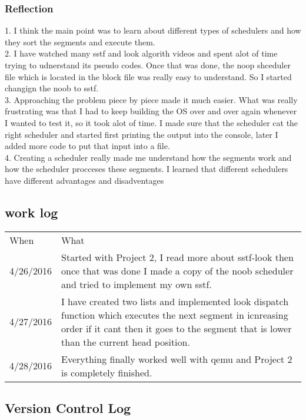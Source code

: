 \documentclass[letterpaper,10pt,draftclsnofoot,onecolumn]{IEEEtran}
\begin{document}
\subsubsection*{Reflection}
	1. I think the main point was to learn about different types of schedulers and how they sort the segments and execute them.\\
	2. I have watched many sstf and look algorith videos and spent alot of time trying to udnerstand its pseudo codes. Once that was done, the noop shceduler file which is located in the block file was really easy to understand. So I started changign the noob to sstf.\\
	3. Approaching the problem piece by piece made it much easier. What was really frustrating was that I had to keep building the OS over and over again whenever I wanted to test it, so it took alot of time. I made sure that the scheduler cat the right scheduler and started first printing the output into the console, later I added more code to put that input into a file.\\
	4. Creating a scheduler really made me understand how the segments work and how the scheduler procceses these segments. I learned that different schedulers have different advantages and disadventages\\

\subsection*{work log}
\begin{center}
\begin{tabular}{ |m{2cm}|m{5cm}| }
\hline
When & What \\
4/26/2016 & Started with Project 2, I read more about sstf-look then once that was done I made a copy of the noob scheduler and tried to implement my own sstf.\\
4/27/2016 & I have created two lists and implemented look dispatch function which executes the next segment in icnreasing order if it cant then it goes to the segment that is lower than the current head position.\\
4/28/2016 & Everything finally worked well with qemu and Project 2 is completely finished.\\
\hline
\end{tabular}
\end{center}

\subsection*{Version Control Log}

\end{document}
